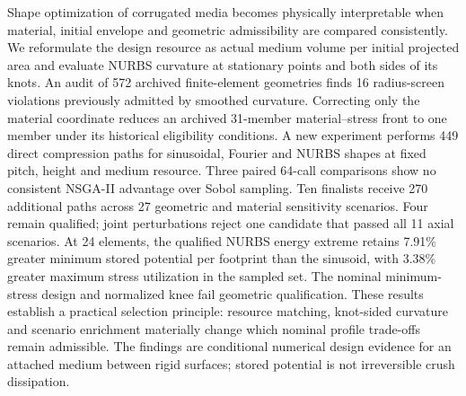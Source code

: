 Shape optimization of corrugated media becomes physically interpretable when material, initial envelope and geometric admissibility are compared consistently. We reformulate the design resource as actual medium volume per initial projected area and evaluate NURBS curvature at stationary points and both sides of its knots. An audit of 572 archived finite-element geometries finds 16 radius-screen violations previously admitted by smoothed curvature. Correcting only the material coordinate reduces an archived 31-member material--stress front to one member under its historical eligibility conditions. A new experiment performs 449 direct compression paths for sinusoidal, Fourier and NURBS shapes at fixed pitch, height and medium resource. Three paired 64-call comparisons show no consistent NSGA-II advantage over Sobol sampling. Ten finalists receive 270 additional paths across 27 geometric and material sensitivity scenarios. Four remain qualified; joint perturbations reject one candidate that passed all 11 axial scenarios. At 24 elements, the qualified NURBS energy extreme retains 7.91\% greater minimum stored potential per footprint than the sinusoid, with 3.38\% greater maximum stress utilization in the sampled set. The nominal minimum-stress design and normalized knee fail geometric qualification. These results establish a practical selection principle: resource matching, knot-sided curvature and scenario enrichment materially change which nominal profile trade-offs remain admissible. The findings are conditional numerical design evidence for an attached medium between rigid surfaces; stored potential is not irreversible crush dissipation.
